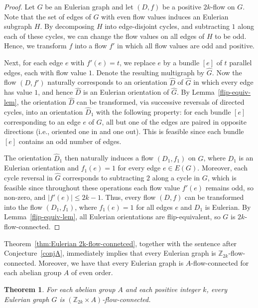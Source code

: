 \documentclass[a4paper,12pt]{article}
\theoremstyle{plain}
\newtheorem{theorem}{Theorem}[section]
\theoremstyle{definition}
\newcommand{\Z}{\mathbb{Z}}
\renewcommand\le\leqslant
\begin{document}
\begin{proof}
    Let $G$ be an Eulerian graph and let $(D,f)$ be a positive $2k$-flow on $G$. 
    Note that the set of edges of $G$ with even flow values induces an Eulerian subgraph $H$. By decomposing $H$ into edge-disjoint cycles, and subtracting $1$ along each of these cycles, we can change the flow values on all edges of $H$ to be odd. Hence, we transform $f$ into a flow $f'$ in which all flow values are odd and positive.

    Next, for each edge $e$ with $f'(e)=t$, we replace $e$ by a bundle $[e]$ of $t$ parallel edges, each with flow value $1$. Denote the resulting multigraph by $\hat{G}$. Now the flow $(D,f')$ naturally corresponds to an orientation $\hat{D}$ of $\hat{G}$ in which every edge has value $1$, and hence $\hat{D}$ is an Eulerian orientation of $\hat{G}$.
%
    By Lemma~\ref{flip-equiv-lem}, the orientation $\hat{D}$ can be transformed, via successive reversals of directed cycles, into an orientation $\hat{D}_1$ with the following property: for each bundle $[e]$ corresponding to an edge $e$ of $G$, all but one of the edges are paired in opposite directions (i.e., oriented one in and one out). This is feasible since each bundle $[e]$ contains an odd number of edges.

    The orientation $\hat{D}_1$ then naturally induces a flow $(D_1,f_1)$ on $G$, where $D_1$ is an Eulerian orientation and $f_1(e)=1$ for every edge $e\in E(G)$. Moreover, each cycle reversal in $\hat{G}$ corresponds to subtracting $2$ along a cycle in $G$, which is feasible since throughout these operations each flow value $f'(e)$ remains odd, so non-zero, and $|f'(e)|\le 2k-1$.
%
    Thus, every flow $(D,f)$ can be transformed into the flow $(D_1,f_1)$, where $f_1(e)=1$ for all edges $e$ and $D_1$ is Eulerian. By Lemma~\ref{flip-equiv-lem}, all Eulerian orientations are flip-equivalent, so $G$ is $2k$-flow-connected.
\end{proof}

Theorem~\ref{thm:Eulerian 2k-flow-connetced}, together with 
the sentence after Conjecture~\ref{conjA},
immediately implies that every Eulerian graph is $\Z_{2k}$-flow-connected. 
Moreover, we have that every Eulerian graph is $A$-flow-connected for each abelian group $A$ of even order.

\begin{theorem} For each abelian group $A$ and each positive integer $k$, every Eulerian graph $G$ is $(\mathbb{Z}_{2k}\times A)$-flow-connected. \end{theorem}
\end{document}
